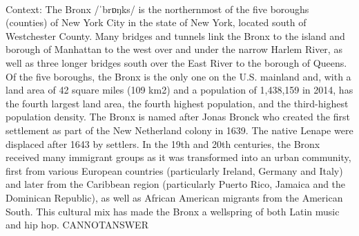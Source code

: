 \documentclass[11pt,a4paper, onecolumn]{article}
\begin{document}
\\ Context: The Bronx /ˈbrɒŋks/ is the northernmost of the five boroughs (counties) of New York City in the state of New York, located south of Westchester County. Many bridges and tunnels link the Bronx to the island and borough of Manhattan to the west over and under the narrow Harlem River, as well as three longer bridges south over the East River to the borough of Queens. Of the five boroughs, the Bronx is the only one on the U.S. mainland and, with a land area of 42 square miles (109 km2) and a population of 1,438,159 in 2014, has the fourth largest land area, the fourth highest population, and the third-highest population density. The Bronx is named after Jonas Bronck who created the first settlement as part of the New Netherland colony in 1639. The native Lenape were displaced after 1643 by settlers. In the 19th and 20th centuries, the Bronx received many immigrant groups as it was transformed into an urban community, first from various European countries (particularly Ireland, Germany and Italy) and later from the Caribbean region (particularly Puerto Rico, Jamaica and the Dominican Republic), as well as African American migrants from the American South. This cultural mix has made the Bronx a wellspring of both Latin music and hip hop. CANNOTANSWER
\end{document}
